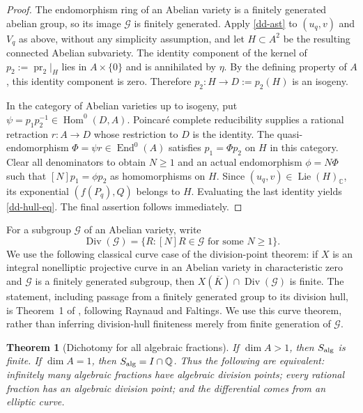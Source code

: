 \documentclass[11pt,a4paper]{article}
\newtheorem{theorem}{Theorem}[section]
\theoremstyle{definition}
\theoremstyle{remark}
\numberwithin{equation}{section}
\begin{document}
\begin{proof}
The endomorphism ring of an Abelian variety is a finitely generated
abelian group, so its image $\mathcal G$ is finitely generated.  Apply
\eqref{dd-ast} to $(u_q,v)$ and $V_q$ as above, without any simplicity
assumption, and let $H\subset A^2$ be the resulting connected Abelian
subvariety.  The identity component of the kernel of
$p_2:=\operatorname{pr}_2|_H$ lies in $A\times\{0\}$ and is
annihilated by $\eta$.  By the defining property of $A$, this identity
component is zero.  Therefore $p_2:H\to D:=p_2(H)$ is an isogeny.

In the category of Abelian varieties up to isogeny, put
$\psi=p_1p_2^{-1}\in\operatorname{Hom}^0(D,A)$.  Poincar\'e complete
reducibility supplies a rational retraction $r:A\to D$ whose
restriction to $D$ is the identity.  The quasi-endomorphism
$\Phi=\psi r\in\operatorname{End}^0(A)$ satisfies
$p_1=\Phi p_2$ on $H$ in this category.  Clear all denominators to
obtain $N\ge1$ and an actual endomorphism $\phi=N\Phi$ such that
$[N]p_1=\phi p_2$ as homomorphisms on $H$.
Since $(u_q,v)\in\operatorname{Lie}(H)_{\mathbb C}$, its exponential
$(f(P_q),Q)$ belongs to $H$.  Evaluating the last identity yields
\eqref{dd-hull-eq}.  The final assertion follows immediately.
\end{proof}

For a subgroup $\mathcal G$ of an Abelian variety, write
\[
 \operatorname{Div}(\mathcal G)
 =\{R:[N]R\in\mathcal G\text{ for some }N\ge1\}.
\]
We use the following classical curve case of the division-point
theorem: if $X$ is an integral nonelliptic projective curve in an
Abelian variety in characteristic zero and $\mathcal G$ is a finitely
generated subgroup, then
$X(\overline K)\cap\operatorname{Div}(\mathcal G)$ is finite.
The statement, including passage from a finitely generated group to
its division hull, is Theorem~1 of
\cite{dd-Oesterle1985}, following Raynaud and Faltings.  We use this
curve theorem, rather than inferring division-hull finiteness merely
from finite generation of $\mathcal G$.

\begin{theorem}[Dichotomy for all algebraic fractions]\label{dd-all-algebraic}
If $\dim A>1$, then $S_{\rm alg}$ is finite.  If $\dim A=1$, then
$S_{\rm alg}=I\cap\mathbb Q$.  Thus the following are equivalent:
infinitely many algebraic fractions have algebraic division points;
every rational fraction has an algebraic division point; and the
differential comes from an elliptic curve.
\end{theorem}
\end{document}

